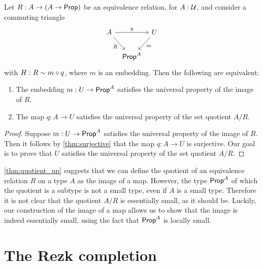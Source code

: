 \begin{prp}\label{thm:quotient_up}
Let $R:A\to (A\to \mathsf{Prop})$ be an equivalence relation, for $A:\mathcal{U}$, and consider a commuting triangle
\begin{equation*}
\begin{tikzcd}[column sep=tiny]
A \arrow[rr,"q"] \arrow[dr,swap,"R"] & & U \arrow[dl,"m"] \\
& \prop^A
\end{tikzcd}
\end{equation*}
with $H:R\sim m\circ q$, where $m$ is an embedding. Then the following are equivalent:
\begin{enumerate}
\item The embedding $m:U\to \mathsf{Prop}^A$ satisfies the universal property of the image of $R$.
\item The map $q:A\to U$ satisfies the universal property of the set quotient $A/R$.
\end{enumerate}
\end{prp}

\begin{proof}
Suppose $m:U\to \mathsf{Prop}^A$ satisfies the universal property of the image of $R$. Then it follows by \cref{thm:surjective} that the map $q:A\to U$ is surjective. Our goal is to prove that $U$ satisfies the universal property of the set quotient $A/R$. 
\end{proof}

\begin{rmk}
\cref{thm:quotient_up} suggests that we can define the quotient of an equivalence relation $R$ on a type $A$ as the image of a map. However, the type $\mathsf{Prop}^A$ of which the quotient is a subtype is not a small type, even if $A$ is a small type.
Therefore it is not clear that the quotient $A/R$ is essentially small, as it should be. Luckily, our construction of the image of a map allows us to show that the image is indeed essentially small, using the fact that $\mathsf{Prop}^A$ is locally small.
\end{rmk}

\section{The Rezk completion}
